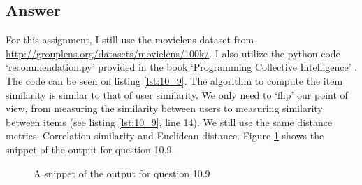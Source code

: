 \documentclass[letterpaper,11pt]{article}
\begin{document}
\subsection*{Answer}
For this assignment, I still use the movielens dataset from \url{http://grouplens.org/datasets/movielens/100k/}. I also utilize the python code `recommendation.py' provided in the book `Programming Collective Intelligence' \cite{pci}. The code can be seen on listing \ref{lst:10_9}. The algorithm to compute the item similarity is similar to that of user similarity. We only need to `flip' our point of view, from measuring the similarity between users to measuring similarity between items (see listing \ref{lst:10_9}, line 14). We still use the same distance metrics: Correlation similarity and Euclidean distance. 
Figure \ref{fig:10_9_output} shows the snippet of the output for question 10.9. 

\begin{figure}[H]
	\centering
	\caption{A snippet of the output for question 10.9}
	\label{fig:10_9_output}
\end{figure}
\end{document}
